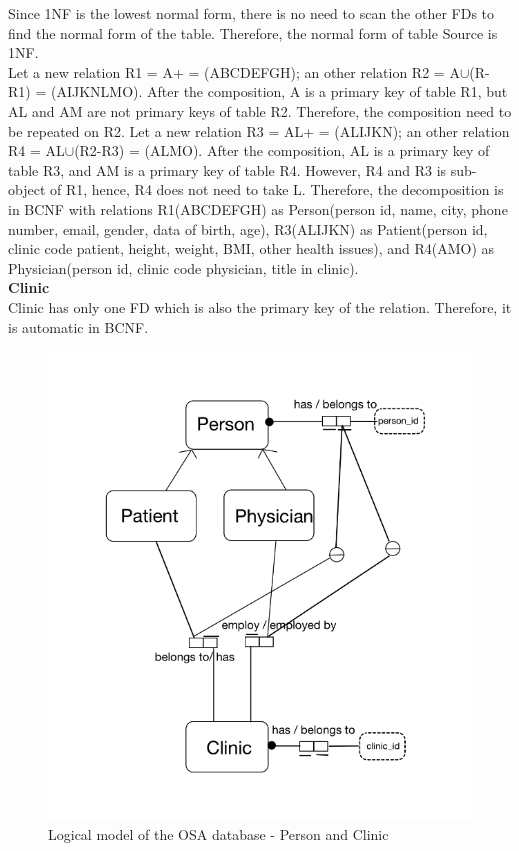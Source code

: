 Since 1NF is the lowest normal form, there is no need to scan the other FDs to find the normal form of the table. Therefore, the normal form of table Source is 1NF.\\
Let a new relation R1 = A+ = (ABCDEFGH); an other relation R2 = A$\cup$(R-R1) = (AIJKNLMO). After the composition, A is a primary key of table R1, but AL and AM are not primary keys of table R2. Therefore, the composition need to be repeated on R2. Let a new relation R3 = AL+ = (ALIJKN); an other relation R4 = AL$\cup$(R2-R3) = (ALMO). After the composition, AL is a primary key of table R3, and AM is a primary key of table R4. However, R4 and R3 is sub-object of R1, hence, R4 does not need to take L. Therefore, the decomposition is in BCNF with relations R1(ABCDEFGH) as Person(person id, name, city, phone number, email, gender, data of birth, age), R3(ALIJKN) as Patient(person id, clinic code patient, height, weight, BMI, other health issues), and R4(AMO) as Physician(person id, clinic code physician, title in clinic).\\
\textbf{Clinic}\\
Clinic has only one FD which is also the primary key of the relation. Therefore, it is automatic in BCNF.\\
\begin{figure}[ht]
    \centering
    \includegraphics[width=1.0\textwidth]{Figures/LogicalModelDB1.png}
    \caption{Logical model of the OSA database - Person and Clinic}
    \label{fig:Figures/LogicalModelDB1}
\end{figure}
